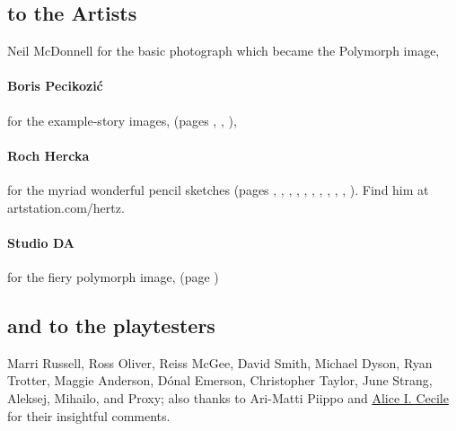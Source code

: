 \begin{multicols}{2}

\subsection*{to the Artists}

Neil McDonnell for the basic photograph which became the Polymorph image,

\paragraph{Boris Pecikozi\'c} for the example-story images, (pages 
\pageref{boris:jump}, 
\pageref{boris:brawl}, 
\pageref{boris:meet}), 

\paragraph{Roch Hercka} for the myriad wonderful pencil sketches (pages 
\pageref{roch:races}, 
\pageref{roch:dwarf}, 
\pageref{roch:stances}, 
\pageref{roch:vitals}, 
\pageref{roch:xp1}, 
\pageref{roch:xp2}, 
\pageref{roch:enchanter}, 
\pageref{roch:polymorph}, 
\pageref{roch:runes}, 
\pageref{roch:trogdor}, 
\pageref{roch:light}
).
Find him at artstation.com/hertz.

\paragraph{Studio DA}
for the fiery polymorph image,
(page \pageref{da:fire}%
)

\subsection*{and to the playtesters} Marri Russell, Ross Oliver, Reiss McGee, David Smith, Michael Dyson, Ryan Trotter, Maggie Anderson, 
D\'{o}nal Emerson, Christopher Taylor, June Strang, 
Aleksej, Mihailo, and Proxy;
also thanks to Ari-Matti Piippo and \href{https://www.twitter.com/AliceICecile}{Alice I. Cecile} for their insightful comments.

\end{multicols}

